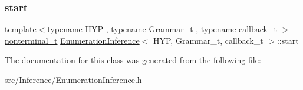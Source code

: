\mbox{\label{class_enumeration_inference_af8fdb3bdee96254a2d35346cf5fb8450}} 
\subsubsection{\texorpdfstring{start}{start}}
{\footnotesize\ttfamily template$<$typename H\+YP , typename Grammar\+\_\+t , typename callback\+\_\+t $>$ \\
\hyperlink{_nonterminal_8h_a1c5bfe9b903f69c83bbde5da7035fef3}{nonterminal\+\_\+t} \hyperlink{class_enumeration_inference}{Enumeration\+Inference}$<$ H\+YP, Grammar\+\_\+t, callback\+\_\+t $>$\+::start}



The documentation for this class was generated from the following file\+:\begin{DoxyCompactItemize}
\item 
src/\+Inference/\hyperlink{_enumeration_inference_8h}{Enumeration\+Inference.\+h}\end{DoxyCompactItemize}

